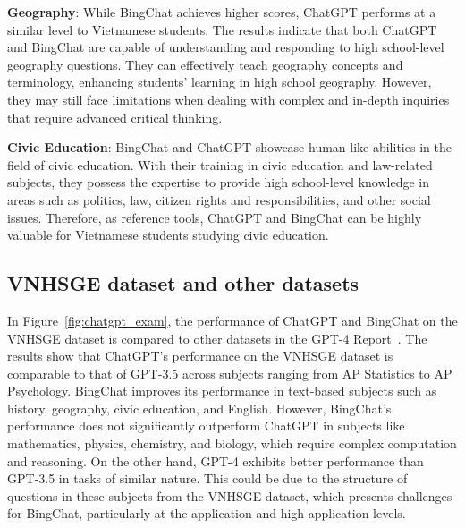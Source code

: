 \documentclass{article}
\begin{document}
{	\textbf{Geography}: While BingChat achieves higher scores, ChatGPT performs at a similar level to Vietnamese students. The results indicate that both ChatGPT and BingChat are capable of understanding and responding to high school-level geography questions. They can effectively teach geography concepts and terminology, enhancing students' learning in high school geography. However, they may still face limitations when dealing with complex and in-depth inquiries that require advanced critical thinking.
	
	\textbf{Civic Education}: BingChat and ChatGPT showcase human-like abilities in the field of civic education. With their training in civic education and law-related subjects, they possess the expertise to provide high school-level knowledge in areas such as politics, law, citizen rights and responsibilities, and other social issues. Therefore, as reference tools, ChatGPT and BingChat can be highly valuable for Vietnamese students studying civic education. 
	
	\subsection{VNHSGE dataset and other datasets}
	
	In Figure~\ref{fig:chatgpt_exam}, the performance of ChatGPT and BingChat on the VNHSGE dataset is compared to other datasets in the GPT-4 Report~\cite{OpenAI_gpt_4_report}. The results show that ChatGPT's performance on the VNHSGE dataset is comparable to that of GPT-3.5 across subjects ranging from AP Statistics to AP Psychology. BingChat improves its performance in text-based subjects such as history, geography, civic education, and English. However, BingChat's performance does not significantly outperform ChatGPT in subjects like mathematics, physics, chemistry, and biology, which require complex computation and reasoning. On the other hand, GPT-4 exhibits better performance than GPT-3.5 in tasks of similar nature. This could be due to the structure of questions in these subjects from the VNHSGE dataset, which presents challenges for BingChat, particularly at the application and high application levels.
	
}
\end{document}
